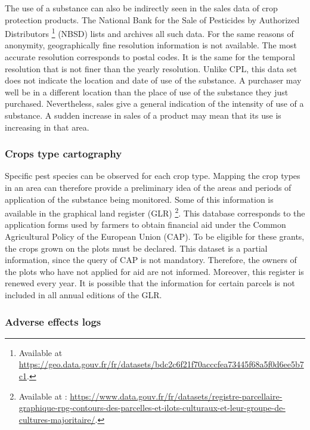 The use of a substance can also be indirectly seen in the sales data of crop protection products. The National Bank for the Sale of Pesticides by Authorized Distributors \footnote{Available at \url{https://geo.data.gouv.fr/fr/datasets/bdc2c6f21f70acccfea73445f68a5f0d6ee5b7c1}.} (NBSD) lists and archives all such data. For the same reasons of anonymity, geographically fine resolution information is not available. The most accurate resolution corresponds to postal codes. It is the same for the temporal resolution that is not finer than the yearly resolution. Unlike CPL, this data set does not indicate the location and date of use of the substance. A purchaser may well be in a different location than the place of use of the substance they just purchased. Nevertheless, sales give a general indication of the intensity of use of a substance. A sudden increase in sales of a product may mean that its use is increasing in that area.  

\subsubsection{Crops type cartography}

Specific pest species can be observed for each crop type. Mapping the crop types in an area can therefore provide a preliminary idea of the areas and periods of application of the substance being monitored. Some of this information is available in the graphical land register (GLR) \footnote{Available at : \url{https://www.data.gouv.fr/fr/datasets/registre-parcellaire-graphique-rpg-contours-des-parcelles-et-ilots-culturaux-et-leur-groupe-de-cultures-majoritaire/}.}. This database corresponds to the application forms used by farmers to obtain financial aid under the Common Agricultural Policy of the European Union (CAP). To be eligible for these grants, the crops grown on the plots must be declared. This dataset is a partial information, since the query of CAP is not mandatory. Therefore, the owners of the plots who have not applied for aid are not informed. Moreover, this register is renewed every year. It is possible that the information for certain parcels is not included in all annual editions of the GLR. 

\subsubsection{Adverse effects logs}

